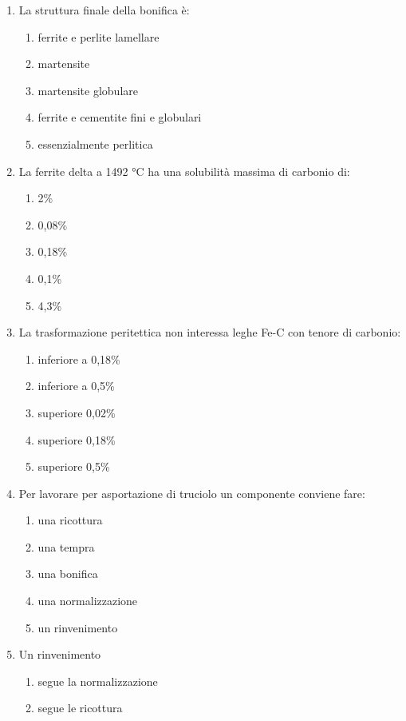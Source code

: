 \begin{enumerate}
    \item La struttura finale della bonifica è:
    \begin{enumerate}
        \item ferrite e perlite lamellare
        \item martensite
        \item martensite globulare
        \item ferrite e cementite fini e globulari
        \item essenzialmente perlitica
    \end{enumerate}
    \item La ferrite delta a 1492 °C ha una solubilità massima di carbonio di:
    \begin{enumerate}
        \item 2\%
        \item 0,08\%
        \item 0,18\%
        \item 0,1\%
        \item 4,3\%
    \end{enumerate}
    \item La trasformazione peritettica non interessa leghe Fe-C con tenore di carbonio:
    \begin{enumerate}
        \item inferiore a 0,18\%
        \item inferiore a 0,5\%
        \item superiore 0,02\%
        \item superiore 0,18\%
        \item superiore 0,5\%
    \end{enumerate}
    \item Per lavorare per asportazione di truciolo un componente conviene fare:
    \begin{enumerate}
        \item una ricottura
        \item una tempra
        \item una bonifica
        \item una normalizzazione
        \item un rinvenimento
    \end{enumerate}
    \item Un rinvenimento
    \begin{enumerate}
        \item segue la normalizzazione
        \item segue le ricottura

\end{enumerate}
\end{enumerate}
